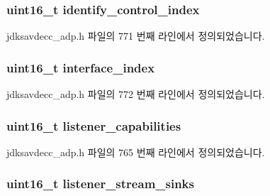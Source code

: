 \subsubsection[{\texorpdfstring{identify\+\_\+control\+\_\+index}{identify_control_index}}]{\setlength{\rightskip}{0pt plus 5cm}uint16\+\_\+t identify\+\_\+control\+\_\+index}\hypertarget{structjdksavdecc__adpdu_a69d51a66f10075eb16f0f66089a66a41}{}\label{structjdksavdecc__adpdu_a69d51a66f10075eb16f0f66089a66a41}


jdksavdecc\+\_\+adp.\+h 파일의 771 번째 라인에서 정의되었습니다.

\subsubsection[{\texorpdfstring{interface\+\_\+index}{interface_index}}]{\setlength{\rightskip}{0pt plus 5cm}uint16\+\_\+t interface\+\_\+index}\hypertarget{structjdksavdecc__adpdu_a6854e0a91fc5bf42d2186aba65dd247d}{}\label{structjdksavdecc__adpdu_a6854e0a91fc5bf42d2186aba65dd247d}


jdksavdecc\+\_\+adp.\+h 파일의 772 번째 라인에서 정의되었습니다.

\subsubsection[{\texorpdfstring{listener\+\_\+capabilities}{listener_capabilities}}]{\setlength{\rightskip}{0pt plus 5cm}uint16\+\_\+t listener\+\_\+capabilities}\hypertarget{structjdksavdecc__adpdu_a3323f8a756edef6c94b10e2ab6c962ee}{}\label{structjdksavdecc__adpdu_a3323f8a756edef6c94b10e2ab6c962ee}


jdksavdecc\+\_\+adp.\+h 파일의 765 번째 라인에서 정의되었습니다.

\subsubsection[{\texorpdfstring{listener\+\_\+stream\+\_\+sinks}{listener_stream_sinks}}]{\setlength{\rightskip}{0pt plus 5cm}uint16\+\_\+t listener\+\_\+stream\+\_\+sinks}\hypertarget{structjdksavdecc__adpdu_aacb4d50f4068a0a36c8746e0571bf53b}{}\label{structjdksavdecc__adpdu_aacb4d50f4068a0a36c8746e0571bf53b}


